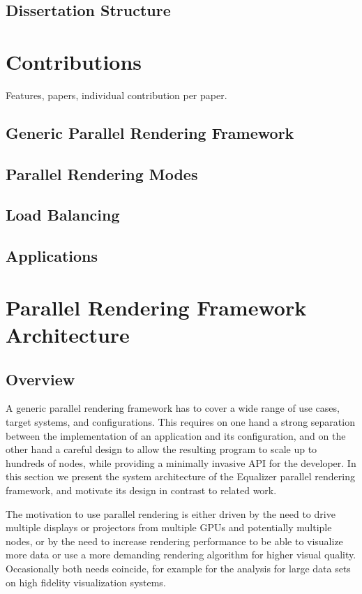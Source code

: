 \section{Dissertation Structure}


\chapter{Contributions}

Features, papers, individual contribution per paper.

\section{Generic Parallel Rendering Framework}

\section{Parallel Rendering Modes}

\section{Load Balancing}

\section{Applications}


\chapter{Parallel Rendering Framework Architecture}

\section{Overview}
A generic parallel rendering framework has to cover a wide range of use cases,
target systems, and configurations. This requires on one hand a strong
separation between the implementation of an application and its configuration,
and on the other hand a careful design to allow the resulting program to scale
up to hundreds of nodes, while providing a minimally invasive API for the
developer. In this section we present the system architecture of the Equalizer
parallel rendering framework, and motivate its design in contrast to related
work.

The motivation to use parallel rendering is either driven by the need to drive
multiple displays or projectors from multiple GPUs and potentially multiple
nodes, or by the need to increase rendering performance to be able to visualize
more data or use a more demanding rendering algorithm for higher visual quality.
Occasionally both needs coincide, for example for the analysis for large data
sets on high fidelity visualization systems.

